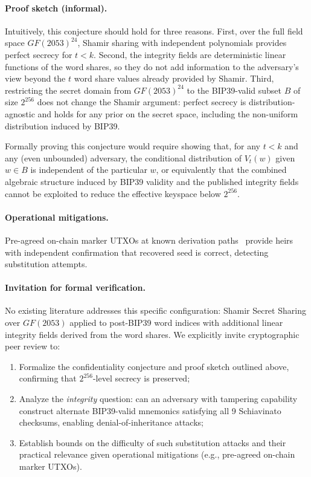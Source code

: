 \documentclass[11pt]{article}
\begin{document}
\paragraph{Proof sketch (informal).}
Intuitively, this conjecture should hold for three reasons. First, over the full field space $GF(2053)^{24}$, Shamir sharing with independent polynomials provides perfect secrecy for $t < k$. Second, the integrity fields are deterministic linear functions of the word shares, so they do not add information to the adversary's view beyond the $t$ word share values already provided by Shamir. Third, restricting the secret domain from $GF(2053)^{24}$ to the BIP39-valid subset $B$ of size $2^{256}$ does not change the Shamir argument: perfect secrecy is distribution-agnostic and holds for any prior on the secret space, including the non-uniform distribution induced by BIP39.

Formally proving this conjecture would require showing that, for any $t < k$ and any (even unbounded) adversary, the conditional distribution of $V_t(w)$ given $w \in B$ is independent of the particular $w$, or equivalently that the combined algebraic structure induced by BIP39 validity and the published integrity fields cannot be exploited to reduce the effective keyspace below $2^{256}$.

\paragraph{Operational mitigations.} Pre-agreed on-chain marker UTXOs at known derivation paths~\cite{bip44} provide heirs with independent confirmation that recovered seed is correct, detecting substitution attempts.

\paragraph{Invitation for formal verification.} No existing literature addresses this specific configuration: Shamir Secret Sharing over $GF(2053)$ applied to post-BIP39 word indices with additional linear integrity fields derived from the word shares. We explicitly invite cryptographic peer review to:
\begin{enumerate}[noitemsep]
    \item Formalize the confidentiality conjecture and proof sketch outlined above, confirming that $2^{256}$-level secrecy is preserved;
    \item Analyze the \textit{integrity} question: can an adversary with tampering capability construct alternate BIP39-valid mnemonics satisfying all 9 Schiavinato checksums, enabling denial-of-inheritance attacks;
    \item Establish bounds on the difficulty of such substitution attacks and their practical relevance given operational mitigations (e.g., pre-agreed on-chain marker UTXOs).
\end{enumerate}
\end{document}
